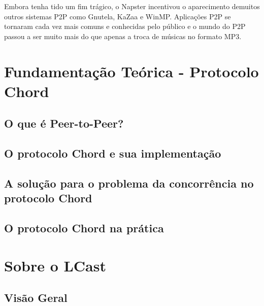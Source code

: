 \documentclass[
10pt, %
a4paper, %
oneside, %
headinclude,footinclude, %
BCOR5mm, %
]{scrartcl}
\theoremstyle{definition} %
\theoremstyle{plain} %
\theoremstyle{remark} %
\begin{document}
Embora tenha tido um fim trágico, o Napster incentivou o aparecimento demuitos outros sistemas P2P como Gnutela, KaZaa e WinMP. Aplicações P2P se tornaram cada vez mais comuns e conhecidas pelo público e o mundo do P2P passou a ser muito mais do que apenas a troca de músicas no formato MP3.

\newpage


\section{Fundamentação Teórica - Protocolo Chord}

\subsection{O que é Peer-to-Peer?}

\subsection{O protocolo Chord e sua implementação}

\subsection{A solução para o problema da concorrência no protocolo Chord}

\subsection{O protocolo Chord na prática}

\newpage


\section{Sobre o LCast}

\subsection{Visão Geral}
\end{document}
